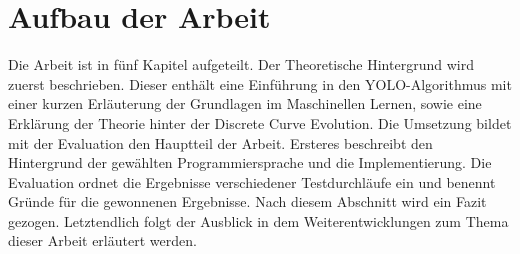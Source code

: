 \section{Aufbau der Arbeit}
{Die Arbeit ist in fünf Kapitel aufgeteilt. Der Theoretische Hintergrund wird zuerst beschrieben. Dieser enthält eine Einführung in den YOLO-Algorithmus mit einer kurzen Erläuterung der Grundlagen im Maschinellen Lernen, sowie eine Erklärung der Theorie hinter der Discrete Curve Evolution. Die Umsetzung bildet mit der Evaluation den Hauptteil der Arbeit. Ersteres beschreibt den Hintergrund der gewählten Programmiersprache und die Implementierung. Die Evaluation ordnet die Ergebnisse verschiedener Testdurchläufe ein und benennt Gründe für die gewonnenen Ergebnisse. Nach diesem Abschnitt wird ein Fazit gezogen. Letztendlich folgt der Ausblick in dem Weiterentwicklungen zum Thema dieser Arbeit erläutert werden. }




